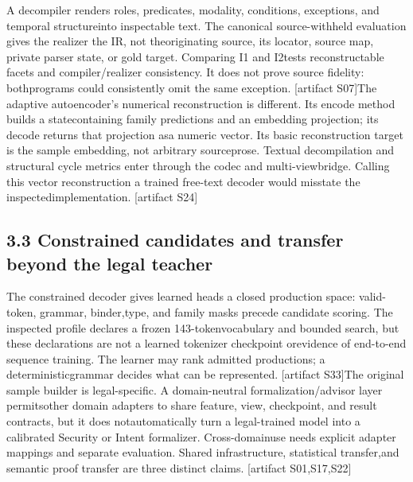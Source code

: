 
\noindent
A decompiler renders roles, predicates, modality, conditions, exceptions, and temporal structure\linebreak[4]
into inspectable text. The canonical source-withheld evaluation gives the realizer the IR, not the\linebreak[4]
originating source, its locator, source map, private parser state, or gold target. Comparing I1 and I2\linebreak[4]
tests reconstructable facets and compiler/realizer consistency. It does not prove source fidelity: both\linebreak[4]
programs could consistently omit the same exception. [artifact S07]\linebreak[4]
The adaptive autoencoder's numerical reconstruction is different. Its encode method builds a state\linebreak[4]
containing family predictions and an embedding projection; its decode returns that projection as\linebreak[4]
a numeric vector. Its basic reconstruction target is the sample embedding, not arbitrary source\linebreak[4]
prose. Textual decompilation and structural cycle metrics enter through the codec and multi-view\linebreak[4]
bridge. Calling this vector reconstruction a trained free-text decoder would misstate the inspected\linebreak[4]
implementation. [artifact S24]\par

\subsection*{3.3  Constrained candidates and transfer beyond the legal teacher}
\noindent
The constrained decoder gives learned heads a closed production space: valid-token, grammar, binder,\linebreak[4]
type, and family masks precede candidate scoring. The inspected profile declares a frozen 143-token\linebreak[4]
vocabulary and bounded search, but these declarations are not a learned tokenizer checkpoint or\linebreak[4]
evidence of end-to-end sequence training. The learner may rank admitted productions; a deterministic\linebreak[4]
grammar decides what can be represented. [artifact S33]\linebreak[4]
The original sample builder is legal-specific. A domain-neutral formalization/advisor layer permits\linebreak[4]
other domain adapters to share feature, view, checkpoint, and result contracts, but it does not\linebreak[4]
automatically turn a legal-trained model into a calibrated Security or Intent formalizer. Cross-domain\linebreak[4]
use needs explicit adapter mappings and separate evaluation. Shared infrastructure, statistical transfer,\linebreak[4]
and semantic proof transfer are three distinct claims. [artifact S01,S17,S22]\par


